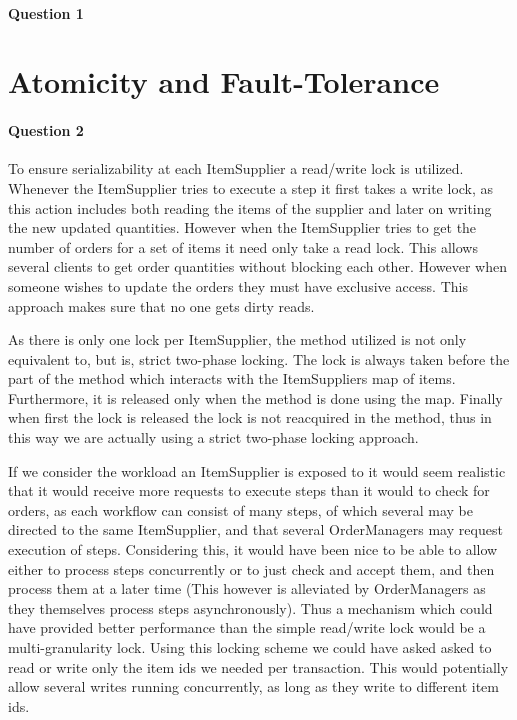 \documentclass[a4paper, 11pt]{article}
\begin{document}
\paragraph{Question 1} %
\label{par:question_1}



\section{Atomicity and Fault-Tolerance} %
\label{sec:atomicity_and_fault_tolerance}

\paragraph{Question 2} %
\label{par:question_2}

To ensure serializability at each ItemSupplier a read/write lock is utilized. Whenever the ItemSupplier tries to execute a step it first takes a write lock, as this action includes both reading the items of the supplier and later on writing the new updated quantities. However when the ItemSupplier tries to get the number of orders for a set of items it need only take a read lock. This allows several clients to get order quantities without blocking each other. However when someone wishes to update the orders they must have exclusive access. This approach makes sure that no one gets dirty reads.

As there is only one lock per ItemSupplier, the method utilized is not only equivalent to, but is, strict two-phase locking. The lock is always taken before the part of the method which interacts with the ItemSuppliers map of items. Furthermore, it is released only when the method is done using the map. Finally when first the lock is released the lock is not reacquired in the method, thus in this way we are actually using a strict two-phase locking approach.

If we consider the workload an ItemSupplier is exposed to it would seem realistic that it would receive more requests to execute steps than it would to check for orders, as each workflow can consist of many steps, of which several may be directed to the same ItemSupplier, and that several OrderManagers may request execution of steps. Considering this, it would have been nice to be able to allow either to process steps concurrently or to just check and accept them, and then process them at a later time (This however is alleviated by OrderManagers as they themselves process steps asynchronously). Thus a mechanism which could have provided better performance than the simple read/write lock would be a multi-granularity lock. Using this locking scheme we could have asked asked to read or write only the item ids we needed per transaction. This would potentially allow several writes running concurrently, as long as they write to different item ids.
\end{document}
